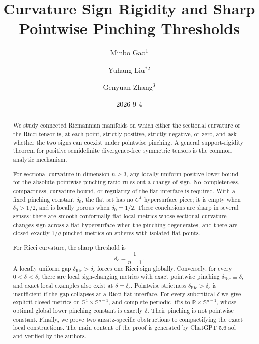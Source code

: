 \documentclass[11pt,reqno]{amsart}
\title[Curvature sign rigidity and sharp pinching thresholds]
{Curvature Sign Rigidity and Sharp Pointwise Pinching Thresholds}
\author{Minbo Gao$^1$}
\author{Yuhang Liu$^{*2}$}
\author{Genyuan Zhang$^3$}
\date{2026-9-4}
\theoremstyle{definition}
\theoremstyle{remark}
\newcommand{\R}{\mathbb R}
\newcommand{\Sph}{\mathbb S}
\newcommand{\dric}{\delta_{\mathrm{Ric}}}
\begin{document}




\maketitle



\begin{abstract}
We study connected Riemannian manifolds on which either the sectional curvature or the Ricci tensor is, at each point, strictly positive, strictly negative, or zero, and ask whether the two signs can coexist under pointwise pinching.  A general support-rigidity theorem for positive semidefinite divergence-free symmetric tensors is the common analytic mechanism.

For sectional curvature in dimension $n\ge 3$, any locally uniform positive lower bound for the absolute pointwise pinching ratio rules out a change of sign.  No completeness, compactness, curvature bound, or regularity of the flat interface is required.  With a fixed pinching constant $\delta_0$, the flat set has no $C^1$ hypersurface piece; it is empty when $\delta_0>1/2$, and is locally porous when $\delta_0=1/2$.  These conclusions are sharp in several senses: there are smooth conformally flat local metrics whose sectional curvature changes sign across a flat hypersurface when the pinching degenerates, and there are closed exactly $1/q$-pinched metrics on spheres with isolated flat points.

For Ricci curvature, the sharp threshold is
\[
\delta_c=\frac1{n-1}.
\]
A locally uniform gap $\dric>\delta_c$ forces one Ricci sign globally.  Conversely, for every $0<\delta<\delta_c$ there are local sign-changing metrics with exact pointwise pinching $\dric\equiv\delta$, and exact local examples also exist at $\delta=\delta_c$.  Pointwise strictness $\dric>\delta_c$ is insufficient if the gap collapses at a Ricci-flat interface.  For every subcritical $\delta$ we give explicit closed metrics on $\Sph^1\times\Sph^{n-1}$, and complete periodic lifts to $\R\times\Sph^{n-1}$, whose optimal global lower pinching constant is exactly $\delta$.  Their pinching is not pointwise constant.  Finally, we prove two ansatz-specific obstructions to compactifying the exact local constructions. The main content of the proof is generated by ChatGPT 5.6 sol and verified by the authors.
\end{abstract}
\end{document}
